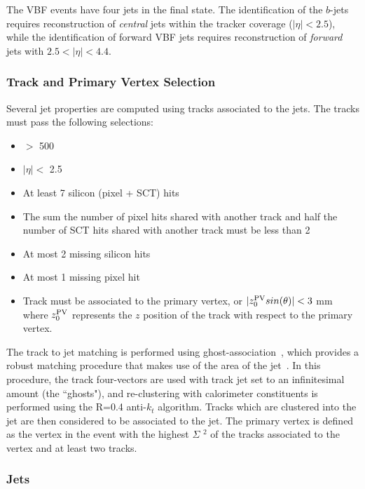 \label{sec:vbf-objsel}

The VBF \Hbb events have four jets in the final state.
The identification of the $b$-jets requires reconstruction of
{\it central} jets within the tracker coverage ($|\eta|<2.5$), while
the identification of forward VBF jets requires reconstruction
of {\it forward} jets with $2.5<|\eta|<4.4$. 


\subsubsection{Track and Primary Vertex Selection}

Several jet properties are computed using tracks associated to the jets. The tracks must pass the following selections:

\begin{itemize}
\item \pT $>$ 500 \mev
\item $|\eta| < $ 2.5
\item At least 7 silicon (pixel + SCT) hits
\item The sum the number of pixel hits shared with another track and half the number of SCT hits shared with another track must be less than 2
\item At most 2 missing silicon hits
\item At most 1 missing pixel hit
\item Track must be associated to the primary vertex, or $|z_0^{\rm PV}sin(\theta)| < 3$ mm  where $z_0^{\rm PV}$ represents the $z$ position of the track with respect to the primary vertex.
\end{itemize}

The track to jet matching is performed using ghost-association~\cite{GhostMatching,jetareas,atlasjetsub}, which provides a robust matching procedure that makes use of the area of the jet~\cite{GhostMatching}. In this procedure, the track four-vectors are used with track jet \pT set to an infinitesimal amount (the ``ghosts"), and re-clustering with calorimeter constituents is performed using the R=0.4 anti-$k_t$
algorithm.  Tracks which are clustered into the jet are then considered to be associated to the jet.  
The primary vertex is defined as the vertex in the event with the highest $\Sigma$ \pT$^2$ of the tracks associated to the vertex and at least two tracks.


\subsubsection{Jets}
\label{sec:vbf-jets}

